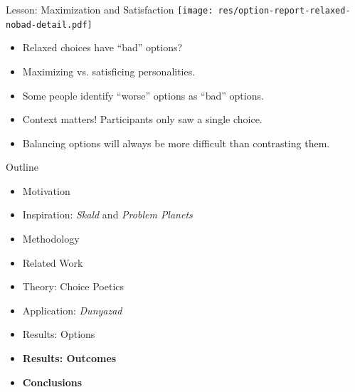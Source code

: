 \documentclass[xcolor=x11names]{beamer}
\def\dunyazad/{\textit{Dunyazad}}
\def\skald/{\textit{Skald}}
\def\problemplanets/{\textit{Problem Planets}}
\begin{document}
\begin{frame}{Lesson: Maximization and Satisfaction}
  \centering
  \texttt{[image: res/option-report-relaxed-nobad-detail.pdf]} \\
  \raggedright
  \begin{itemize}\addtolength{\itemsep}{0.5\baselineskip}
    \item Relaxed choices have ``bad'' options?
    \item Maximizing vs\@. satisficing personalities. \\
      {\tiny {}}
      \pause
    \item Some people identify ``worse'' options as ``bad'' options.
      \pause
    \item Context matters! Participants only saw a single choice.
    \item Balancing options will always be more difficult than contrasting them.
  \end{itemize}
\end{frame}


\begin{frame}{Outline}
  \begin{itemize}
    \item Motivation
    \item Inspiration: \skald/ and \problemplanets/
    \item Methodology
    \item Related Work
    \item Theory: Choice Poetics
    \item Application: \dunyazad/
    \item Results: Options
    \item \textbf{Results: Outcomes}
    \item \textbf{Conclusions}
  \end{itemize}
\end{frame}
\end{document}
